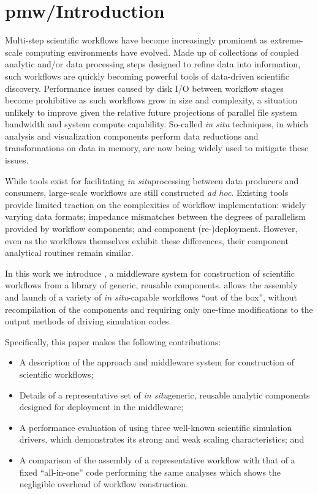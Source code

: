 
\newcommand{\insitu}{\textit{in situ}}
\section{pmw/Introduction}

Multi-step scientific workflows have become increasingly prominent as
extreme-scale computing environments have evolved. Made up of collections of
coupled analytic and/or data processing steps designed to refine data into
information, such workflows are quickly becoming powerful tools of data-driven
scientific discovery.
Performance issues caused by disk I/O between workflow stages become prohibitive
as such workflows grow in size and complexity, a situation unlikely to improve
given the relative future projections of parallel file system bandwidth and system
compute capability. So-called \textit{in situ} techniques, in which analysis and visualization
components perform data reductions and transformations on data in memory, are now
being widely used to mitigate these issues. 

While tools exist for facilitating \insitu processing between data producers and
consumers, large-scale workflows are still constructed  \textit{ad hoc}. Existing
tools provide limited traction on the complexities of workflow implementation:
widely varying data formats; impedance mismatches between the degrees
of parallelism provided by workflow components; and component (re-)deployment.
However, even as the workflows themselves exhibit these differences, their component
analytical routines remain similar.

In this work we introduce \sys, a middleware system for construction of
scientific workflows from a library of generic, reusable components. \sys allows the assembly
and launch of a variety of \insitu -capable workflows ``out of the box'', without
recompilation of the components and requiring only one-time modifications to the
output methods of driving simulation codes.

Specifically, this paper makes the following contributions:
\begin{itemize}
\item A description of the \sys approach and middleware system for construction
  of scientific workflows;
\item Details of a representative set of \insitu generic, reusable analytic
  components designed for deployment in the \sys middleware;
\item A performance evaluation of \sys using three well-known scientific simulation
  drivers, which demonstrates its strong and weak scaling characteristics; and
\item A comparison of the assembly of a representative \sys workflow with
  that of a fixed ``all-in-one'' code performing the same analyses which
  shows the negligible overhead of \sys workflow construction.
\end{itemize}

